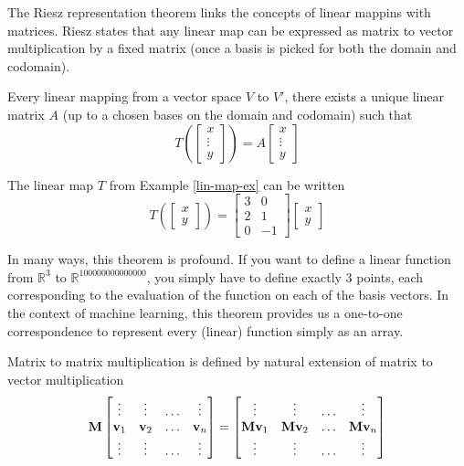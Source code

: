 The Riesz representation theorem links the concepts of linear mappins with matrices. Riesz states that any linear map can be expressed as matrix to vector multiplication by a fixed matrix (once a basis is picked for both the domain and codomain).

\begin{theorem} Every linear mapping from a vector space $V$ to $V'$, there exists a unique linear matrix $A$ (up to a chosen bases on the domain and codomain) such that 
$$T\left(\begin{bmatrix}x \\ \vdots \\ y\end{bmatrix}\right) = A \begin{bmatrix}x \\ \vdots \\ y\end{bmatrix}$$
\end{theorem}

\begin{example}
The linear map $T$ from Example \ref{lin-map-ex} can be written 
$$T\left(\begin{bmatrix}x \\y\end{bmatrix}\right) 
= 
\begin{bmatrix}
3 & 0 \\
2 & 1 \\
0 & -1
\end{bmatrix} 
\begin{bmatrix}
x \\
y
\end{bmatrix}$$
\end{example}

In many ways, this theorem is profound. If you want to define a linear function from $\mathbb R^3$ to $\mathbb R^{100000000000000}$, you simply have to define exactly 3 points, each corresponding to the evaluation of the function on each of the basis vectors. In the context of machine learning, this theorem provides us a one-to-one correspondence to represent every (linear) function simply as an array. 

\begin{definition}
Matrix to matrix multiplication is defined by natural extension of matrix to vector multiplication
$$\MM \begin{bmatrix}
\vdots & \vdots & \ldots & \vdots \\
\vv_1 & \vv_2 & \ldots & \vv_n \\
\vdots & \vdots & \ldots & \vdots \\
\end{bmatrix} = \begin{bmatrix}
\vdots & \vdots & \ldots & \vdots \\
\MM \vv_1 & \MM \vv_2 & \ldots & \MM\vv_n \\
\vdots & \vdots & \ldots & \vdots \\
\end{bmatrix}$$
\end{definition}

